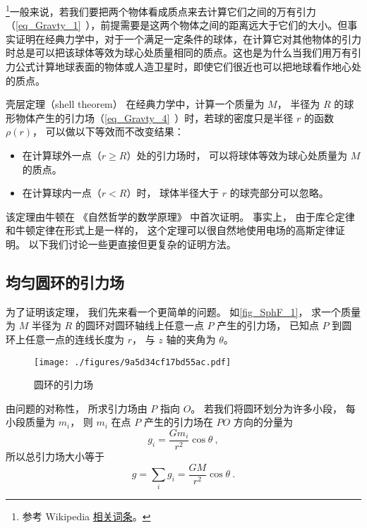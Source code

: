 

\footnote{参考 Wikipedia \href{https://en.wikipedia.org/wiki/Shell_theorem}{相关词条}。}一般来说，若我们要把两个物体看成质点来去计算它们之间的万有引力（\autoref{eq_Gravty_1}~），前提需要是这两个物体之间的距离远大于它们的大小。但事实证明在经典力学中，对于一个满足一定条件的球体，在计算它对其他物体的引力时总是可以把该球体等效为球心处质量相同的质点。这也是为什么当我们用万有引力公式计算地球表面的物体或人造卫星时，即使它们很近也可以把地球看作地心处的质点。

\begin{theorem}{壳层定理（shell theorem）}
在经典力学中，计算一个质量为 $M$， 半径为 $R$ 的球形物体产生的引力场（\autoref{eq_Gravty_4}~）时，若球的密度只是半径 $r$ 的函数 $\rho(r)$， 可以做以下等效而不改变结果：
\begin{itemize}
\item 在计算球外一点（$r \geqslant R$）处的引力场时， 可以将球体等效为球心处质量为 $M$ 的质点。
\item 在计算球内一点（$r < R$）时， 球体半径大于 $r$ 的球壳部分可以忽略。
\end{itemize}
\end{theorem}


该定理由牛顿在 《自然哲学的数学原理》 中首次证明。 事实上， 由于库仑定律和牛顿定律在形式上是一样的， 这个定理可以很自然地使用电场的高斯定律证明。 以下我们讨论一些更直接但更复杂的证明方法。

\subsection{均匀圆环的引力场}
为了证明该定理， 我们先来看一个更简单的问题。 如\autoref{fig_SphF_1}， 求一个质量为 $M$ 半径为 $R$ 的圆环对圆环轴线上任意一点 $P$ 产生的引力场， 已知点 $P$ 到圆环上任意一点的连线长度为 $r$， 与 $z$ 轴的夹角为 $\theta$。

\begin{figure}[ht]
\centering
\texttt{[image: ./figures/9a5d34cf17bd55ac.pdf]}
\caption{圆环的引力场} \label{fig_SphF_1}
\end{figure}

由问题的对称性， 所求引力场由 $P$ 指向 $O$。 若我们将圆环划分为许多小段， 每小段质量为 $m_i$， 则 $m_i$ 在点 $P$ 产生的引力场在 $PO$ 方向的分量为
\begin{equation}
g_i = \frac{Gm_i}{r^2}\cos\theta~,
\end{equation}
所以总引力场大小等于
\begin{equation}\label{eq_SphF_2}
g = \sum_i g_i = \frac{GM}{r^2}\cos\theta~.
\end{equation}

